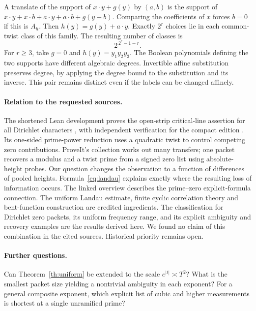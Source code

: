 \documentclass[11pt,letterpaper]{article}
\begin{document}
A translate of the support of $x\cdot y+g(y)$ by $(a,b)$ is the support of $x\cdot y+x\cdot b+a\cdot y+a\cdot b+g(y+b)$. Comparing the coefficients of $x$ forces $b=0$ if this is $A_h$. Then $h(y)=g(y)+a\cdot y$. Exactly $2^r$ choices lie in each common-twist class of this family. The resulting number of classes is
\[
 2^{\,2^r-1-r}.
\]
For $r\ge3$, take $g=0$ and $h(y)=y_1y_2y_3$. The Boolean polynomials defining the two supports have different algebraic degrees. Invertible affine substitution preserves degree, by applying the degree bound to the substitution and its inverse. This pair remains distinct even if the labels can be changed affinely.

\paragraph{Relation to the requested sources.}
The shortened Lean development proves the open-strip critical-line assertion for all Dirichlet characters \cite{Lean}, with independent verification for the compact edition \cite{Rub}. Its one-sided prime-power reduction uses a quadratic twist to control competing zero contributions. ProveIt's collection \cite{PI} works out many transfers; one packet recovers a modulus and a twist prime from a signed zero list using absolute-height probes. Our question changes the observation to a function of differences of pooled heights. Formula~\eqref{eq:landau} explains exactly where the resulting loss of information occurs. The linked overview \cite{Wiki} describes the prime--zero explicit-formula connection. The uniform Landau estimate, finite cyclic correlation theory and bent-function construction are credited ingredients. The classification for Dirichlet zero packets, its uniform frequency range, and its explicit ambiguity and recovery examples are the results derived here. We found no claim of this combination in the cited sources. Historical priority remains open.

\paragraph{Further questions.}
Can Theorem~\ref{th:uniform} be extended to the scale $e^{|t|}\asymp T^2$? What is the smallest packet size yielding a nontrivial ambiguity in each exponent? For a general composite exponent, which explicit list of cubic and higher measurements is shortest at a single unramified prime?
\end{document}

